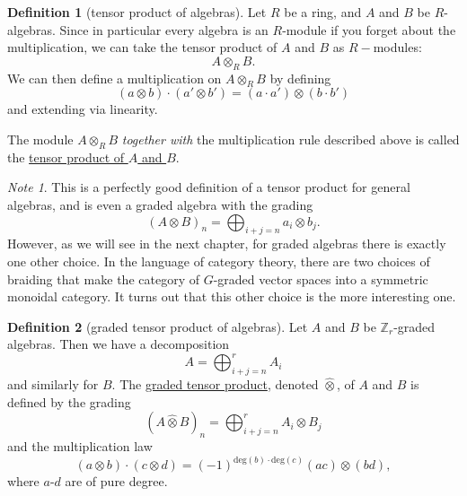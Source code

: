 \documentclass[a4paper]{report}
\newcommand{\Z}{\mathbb{Z}}
\newcommand{\defn}[1]{\ul{#1}}
\theoremstyle{definition}
\newtheorem{definition}{Definition}[section]
\theoremstyle{plain}
\theoremstyle{remark}
\newtheorem{note}{Note}[section]
\begin{document}
\begin{definition}[tensor product of algebras]
  \label{def:tensorproductofalgebras}
  Let $R$ be a ring, and $A$ and $B$ be $R$-algebras. Since in particular every algebra is an $R$-module if you forget about the multiplication, we can take the tensor product of $A$ and $B$ as $R-$modules:
  \begin{equation*}
    A \otimes_{R} B.
  \end{equation*}
  We can then define a multiplication on $A \otimes_{R} B$ by defining
  \begin{equation*}
    (a \otimes b) \cdot (a' \otimes b') = (a \cdot a') \otimes (b \cdot b')
  \end{equation*}
  and extending via linearity.

  The module $A \otimes_{R} B$ \emph{together with} the multiplication rule described above is called the \defn{tensor product of $A$ and $B$}.
\end{definition}
\begin{note}
  This is a perfectly good definition of a tensor product for general algebras, and is even a graded algebra with the grading
  \begin{equation*}
    (A\otimes B)_{n} = \bigoplus_{i+j=n} a_{i} \otimes b_{j}.
  \end{equation*}
  However, as we will see in the next chapter, for graded algebras there is exactly one other choice. In the language of category theory, there are two choices of braiding that make the category of $G$-graded vector spaces into a symmetric monoidal category. It turns out that this other choice is the more interesting one.
\end{note}

\begin{definition}[graded tensor product of algebras]
  \label{def:gradedtensorproduct}
  Let $A$ and $B$ be $\Z_{r}$-graded algebras. Then we have a decomposition
  \begin{equation*}
    A = \bigoplus_{i+j=n}^{r} A_{i}
  \end{equation*}
  and similarly for $B$. The \defn{graded tensor product}, denoted $\hat{\otimes}$, of $A$ and $B$ is defined by the grading
  \begin{equation*}
    (A \hat{\otimes} B)_{n} = \bigoplus_{i+j=n}^{r} A_{i} \otimes B_{j}
  \end{equation*}
  and the multiplication law 
  \begin{equation*}
    (a \otimes b)\cdot(c \otimes d) = (-1)^{\mathrm{deg}(b)\cdot\mathrm{deg}(c)}(ac)\otimes(bd),
  \end{equation*}
  where $a$-$d$ are of pure degree. 
\end{definition}
\end{document}
